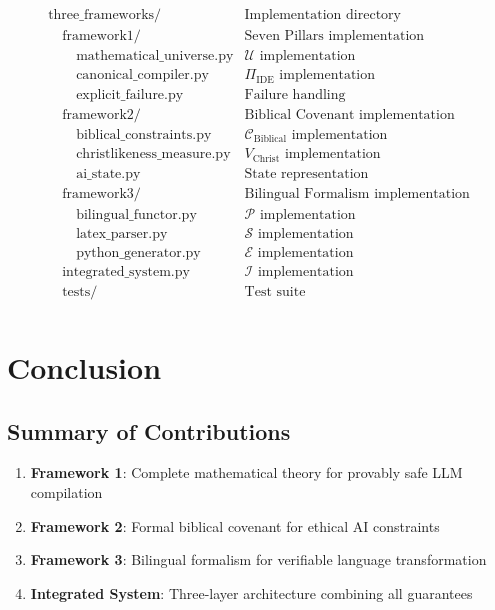 \documentclass[12pt]{article}
\begin{document}
\[
\begin{array}{ll}
\text{three\_frameworks/} & \text{Implementation directory} \\
\quad \text{framework1/} & \text{Seven Pillars implementation} \\
\quad \quad \text{mathematical\_universe.py} & \mathcal{U} \text{ implementation} \\
\quad \quad \text{canonical\_compiler.py} & \Pi_{\text{IDE}} \text{ implementation} \\
\quad \quad \text{explicit\_failure.py} & \text{Failure handling} \\
\quad \text{framework2/} & \text{Biblical Covenant implementation} \\
\quad \quad \text{biblical\_constraints.py} & \mathcal{C}_{\text{Biblical}} \text{ implementation} \\
\quad \quad \text{christlikeness\_measure.py} & V_{\text{Christ}} \text{ implementation} \\
\quad \quad \text{ai\_state.py} & \text{State representation} \\
\quad \text{framework3/} & \text{Bilingual Formalism implementation} \\
\quad \quad \text{bilingual\_functor.py} & \mathcal{P} \text{ implementation} \\
\quad \quad \text{latex\_parser.py} & \mathcal{S} \text{ implementation} \\
\quad \quad \text{python\_generator.py} & \mathcal{E} \text{ implementation} \\
\quad \text{integrated\_system.py} & \mathcal{I} \text{ implementation} \\
\quad \text{tests/} & \text{Test suite} \\
\end{array}
\]

\section{Conclusion}

\subsection{Summary of Contributions}

\begin{enumerate}
    \item \textbf{Framework 1}: Complete mathematical theory for provably safe LLM compilation
    \item \textbf{Framework 2}: Formal biblical covenant for ethical AI constraints
    \item \textbf{Framework 3}: Bilingual formalism for verifiable language transformation
    \item \textbf{Integrated System}: Three-layer architecture combining all guarantees
\end{enumerate}
\end{document}
